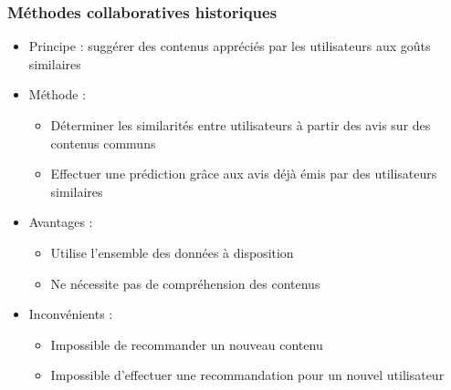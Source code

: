 \documentclass[c]{beamer}
\begin{document}
\begin{frame}
    \frametitle{M\'ethodes collaboratives historiques}

    \begin{itemize}
        \item Principe : sugg\'erer des contenus appr\'eci\'es par les
            utilisateurs aux goûts similaires
        \item<2-> M\'ethode :
            \begin{itemize}
                \item D\'eterminer les similarit\'es entre utilisateurs
                    à partir des avis sur des contenus communs
                \item Effectuer une pr\'ediction gr\^ace aux avis d\'ejà \'emis
                    par des utilisateurs similaires
            \end{itemize}
        \item<3-> Avantages :
            \begin{itemize}
                \item Utilise l'ensemble des donn\'ees à disposition
                \item Ne n\'ecessite pas de compr\'ehension des contenus
            \end{itemize}
        \item<4-> Inconv\'enients :
            \begin{itemize}
                \item Impossible de recommander un nouveau contenu
                \item Impossible d'effectuer une recommandation pour un
                    nouvel utilisateur
            \end{itemize}
    \end{itemize}
\end{frame}
\end{document}

